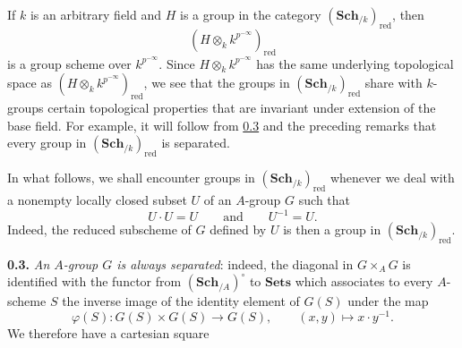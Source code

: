 If \(k\) is an arbitrary field and \(H\) is a group in the category
\((\mathbf{Sch}_{/k})_{\mathrm{red}}\), then
\[
  (H\otimes_k k^{p^{-\infty}})_{\mathrm{red}}
\]
is a group scheme over \(k^{p^{-\infty}}\). Since
\(H\otimes_k k^{p^{-\infty}}\) has the same underlying
topological space as
\((H\otimes_k k^{p^{-\infty}})_{\mathrm{red}}\), we see that the groups in \((\mathbf{Sch}_{/k})_{\mathrm{red}}\) share
with \(k\)-groups certain topological properties that are invariant under
extension of the base field. For example, it will follow from \hyperref[sga3:VIA:0.3]{0.3} and the
preceding remarks that every group in
\((\mathbf{Sch}_{/k})_{\mathrm{red}}\) is separated.

In what follows, we shall encounter groups in
\((\mathbf{Sch}_{/k})_{\mathrm{red}}\) whenever we deal with a nonempty
locally closed subset \(U\) of an \(A\)-group \(G\) such that
\[
  U\cdot U=U
  \qquad\text{and}\qquad
  U^{-1}=U.
\]
Indeed, the reduced subscheme of \(G\) defined by \(U\) is then a group in
\((\mathbf{Sch}_{/k})_{\mathrm{red}}\).

\medskip
\noindent\textbf{0.3.}
\label{sga3:VIA:0.3}
\textit{An \(A\)-group \(G\) is always separated}: indeed, the diagonal in \(G\times_A G\) is identified with the functor from
\((\mathbf{Sch}_{/A})^\circ\) to \(\mathbf{Sets}\) which associates to
every \(A\)-scheme \(S\) the inverse image of the identity element of
\(G(S)\) under the map
\[
  \varphi(S):G(S)\times G(S)\longrightarrow G(S),
  \qquad (x,y)\longmapsto x\cdot y^{-1}.
\]
We therefore have a cartesian square


